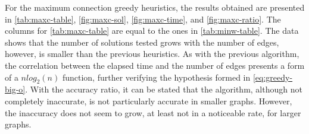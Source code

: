 For the maximum connection greedy heuristics, the results obtained are presented in \autoref{tab:maxc-table}, \autoref{fig:maxc-sol}, \autoref{fig:maxc-time}, and \autoref{fig:maxc-ratio}. 
The columns for \autoref{tab:maxc-table} are equal to the ones in \autoref{tab:minw-table}.
The data shows that the number of solutions tested grows with the number of edges, however, is smaller than the previous heuristics.
As with the previous algorithm, the correlation between the elapsed time and the number of edges presents a form of a $nlog_2(n)$ function, further verifying the hypothesis formed in \autoref{eq:greedy-big-o}.
With the accuracy ratio, it can be stated that the algorithm, although not completely inaccurate, is not particularly accurate in smaller graphs.
However, the inaccuracy does not seem to grow, at least not in a noticeable rate, for larger graphs.

\newpage

